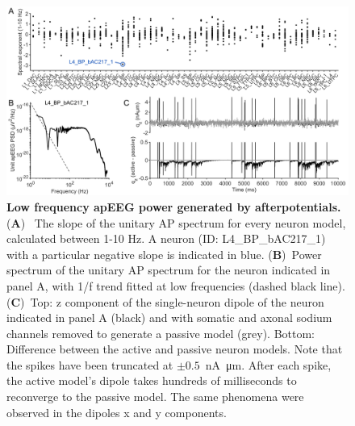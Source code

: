 \begin{figure}[h!]
    \centering
    \includegraphics[width=17cm]{Figures/chapter3/figureS3.png}
    \caption{\textbf{Low frequency apEEG power generated by afterpotentials.} (\textbf{A})~ The slope of the unitary AP spectrum for every neuron model, calculated between 1-10 Hz. A neuron (ID: L4\_BP\_bAC217\_1) with a particular negative slope is indicated in blue. (\textbf{B})~Power spectrum of the unitary AP spectrum for the neuron indicated in panel A, with 1/f trend fitted at low frequencies (dashed black line). (\textbf{C})~Top: z component of the single-neuron dipole of the neuron indicated in panel A (black) and with somatic and axonal sodium channels removed to generate a passive model (grey). Bottom: Difference between the active and passive neuron models. Note that the spikes have been truncated at $\pm 0.5$~\unit{\nano\ampere\micro\meter}. After each spike, the active model's dipole takes hundreds of milliseconds to reconverge to the passive model. The same phenomena were observed in the dipoles x and y components. } 
    \label{fig:low_frequency_apEEG}
\end{figure}

\clearpage

